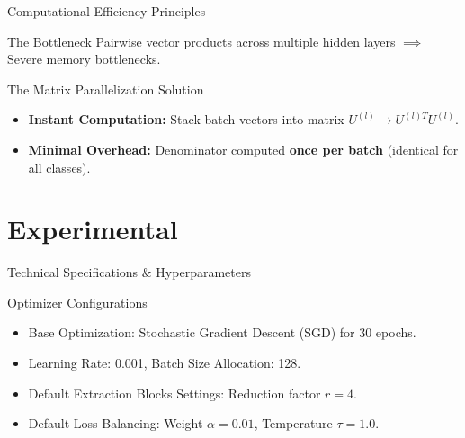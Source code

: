 \documentclass[t, aspectratio=169]{beamer} %
\begin{document}
\begin{frame}{Computational Efficiency Principles}
	\begin{block}{The Bottleneck}
		Pairwise vector products across multiple hidden layers $\implies$ \alert{Severe memory bottlenecks}.
	\end{block}
	\begin{alertblock}{The Matrix Parallelization Solution}
		\begin{itemize}
			\item \textbf{Instant Computation:} Stack batch vectors into matrix $U^{(l)} \rightarrow U^{(l)T}U^{(l)}$.
			\item \textbf{Minimal Overhead:} Denominator computed \textbf{once per batch} (identical for all classes).
		\end{itemize}
	\end{alertblock}
\end{frame}

	\section{Experimental}
	\useStyleLogoOnly
	\useThickBar

	\begin{frame}{Technical Specifications \& Hyperparameters}
		\begin{alertblock}{Optimizer Configurations}
			\begin{itemize}
				\item Base Optimization: Stochastic Gradient Descent (SGD) for 30 epochs.
				\item Learning Rate: 0.001, Batch Size Allocation: 128.
				\item Default Extraction Blocks Settings: Reduction factor $r=4$.
				\item Default Loss Balancing: Weight $\alpha = 0.01$, Temperature $\tau = 1.0$.
			\end{itemize}
		\end{alertblock}
	\end{frame}
\end{document}
